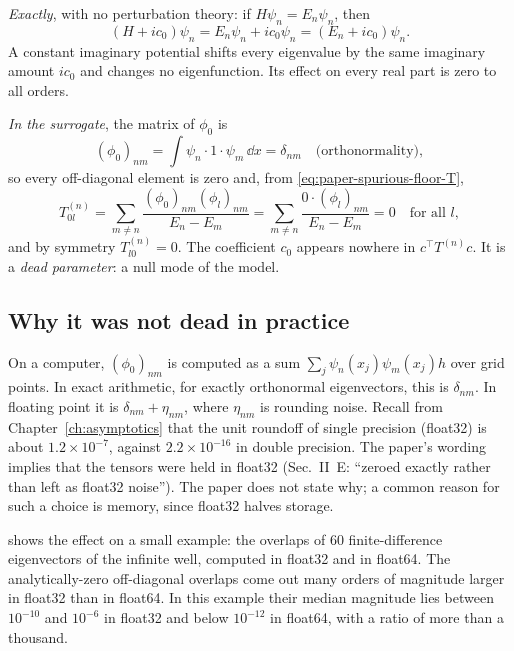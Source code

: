 \emph{Exactly}, with no perturbation theory: if $H\psi_n=E_n\psi_n$, then
\begin{equation}
(H+ic_0)\psi_n=E_n\psi_n+ic_0\psi_n=(E_n+ic_0)\psi_n .\label{eq:paper-spurious-floor-constshift}
\end{equation}
A constant imaginary potential shifts every eigenvalue by the same imaginary amount $ic_0$ and changes no eigenfunction. Its effect on every real part is zero to all orders.

\emph{In the surrogate}, the matrix of $\phi_0$ is
\begin{equation}
(\phi_0)_{nm}=\int\psi_n\cdot1\cdot\psi_m\,\dd x=\delta_{nm}\quad\text{(orthonormality)},\label{eq:paper-spurious-floor-phi0}
\end{equation}
so every off-diagonal element is zero and, from \cref{eq:paper-spurious-floor-T},
\begin{equation}
T^{(n)}_{0l}=\sum_{m\ne n}\frac{(\phi_0)_{nm}(\phi_l)_{nm}}{E_n-E_m}=\sum_{m\ne n}\frac{0\cdot(\phi_l)_{nm}}{E_n-E_m}=0\quad\text{for all }l,\label{eq:paper-spurious-floor-T0l}
\end{equation}
and by symmetry $T^{(n)}_{l0}=0$. The coefficient $c_0$ appears nowhere in $c^\top T^{(n)}c$. It is a \emph{dead parameter}: a null mode of the model.

\subsection{Why it was not dead in practice}

On a computer, $(\phi_0)_{nm}$ is computed as a sum $\sum_j\psi_n(x_j)\psi_m(x_j)h$ over grid points. In exact arithmetic, for exactly orthonormal eigenvectors, this is $\delta_{nm}$. In floating point it is $\delta_{nm}+\eta_{nm}$, where $\eta_{nm}$ is rounding noise. Recall from Chapter~\ref{ch:asymptotics} that the unit roundoff of single precision (float32) is about $1.2\times10^{-7}$, against $2.2\times10^{-16}$ in double precision. The paper's wording implies that the tensors were held in float32 (Sec.~II~E: ``zeroed exactly rather than left as float32 noise''). The paper does not state why; a common reason for such a choice is memory, since float32 halves storage.

 shows the effect on a small example: the overlaps of 60 finite-difference eigenvectors of the infinite well, computed in float32 and in float64. The analytically-zero off-diagonal overlaps come out many orders of magnitude larger in float32 than in float64. In this example their median magnitude lies between $10^{-10}$ and $10^{-6}$ in float32 and below $10^{-12}$ in float64, with a ratio of more than a thousand.

